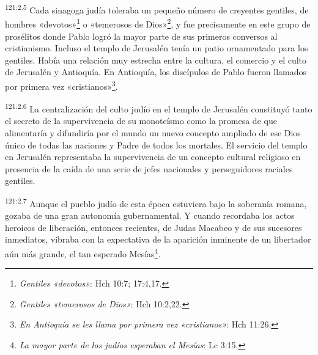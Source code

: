 \par 
\textsuperscript{121:2.5} Cada sinagoga judía toleraba un pequeño número de creyentes gentiles, de hombres «devotos»\footnote{\textit{Gentiles «devotos»}: Hch 10:7; 17:4,17.} o «temerosos de Dios»\footnote{\textit{Gentiles «temerosos de Dios»}: Hch 10:2,22.}, y fue precisamente en este grupo de prosélitos donde Pablo logró la mayor parte de sus primeros conversos al cristianismo. Incluso el templo de Jerusalén tenía un patio ornamentado para los gentiles. Había una relación muy estrecha entre la cultura, el comercio y el culto de Jerusalén y Antioquía. En Antioquía, los discípulos de Pablo fueron llamados por primera vez «cristianos»\footnote{\textit{En Antioquía se les llama por primera vez «cristianos»}: Hch 11:26.}.

\par 
\textsuperscript{121:2.6} La centralización del culto judío en el templo de Jerusalén constituyó tanto el secreto de la supervivencia de su monoteísmo como la promesa de que alimentaría y difundiría por el mundo un nuevo concepto ampliado de ese Dios único de todas las naciones y Padre de todos los mortales. El servicio del templo en Jerusalén representaba la supervivencia de un concepto cultural religioso en presencia de la caída de una serie de jefes nacionales y perseguidores raciales gentiles.

\par 
\textsuperscript{121:2.7} Aunque el pueblo judío de esta época estuviera bajo la soberanía romana, gozaba de una gran autonomía gubernamental. Y cuando recordaba los actos heroicos de liberación, entonces recientes, de Judas Macabeo y de sus sucesores inmediatos, vibraba con la expectativa de la aparición inminente de un libertador aún más grande, el tan esperado Mesías\footnote{\textit{La mayor parte de los judíos esperaban el Mesías}: Lc 3:15.}.


